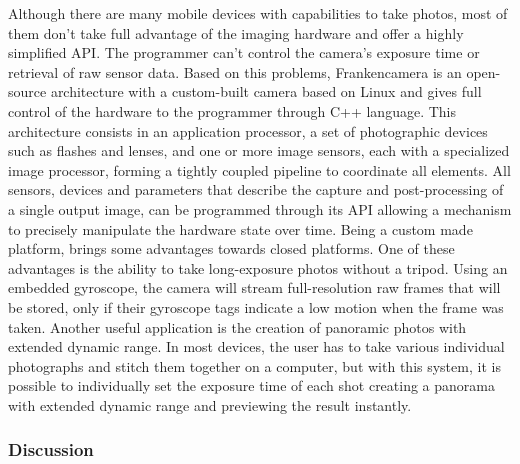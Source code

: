 Although there are many mobile devices with capabilities to take photos, most of them don’t take full advantage of the imaging hardware and offer a highly simplified API. The programmer can’t control the camera’s exposure time or retrieval of raw sensor data. Based on this problems, Frankencamera is an open-source architecture with a custom-built camera based on Linux and gives full control of the hardware to the programmer through C++ language. This architecture consists in an application processor, a set of photographic devices such as flashes and lenses, and one or more image sensors, each with a specialized image processor, forming a tightly coupled pipeline to coordinate all elements. All sensors, devices and parameters that describe the capture and post-processing of a single output image, can be programmed through its API allowing a mechanism to precisely manipulate the hardware state over time.
Being a custom made platform, brings some advantages towards closed platforms. One of these advantages is the ability to take long-exposure photos without a tripod. Using an embedded gyroscope, the camera will stream full-resolution raw frames that will be stored, only if their gyroscope tags indicate a low motion when the frame was taken. 
Another useful application is the creation of panoramic photos with extended dynamic range. In most devices, the user has to take various individual photographs and stitch them together on a computer, but with this system, it is possible to individually set the exposure time of each shot creating a panorama with extended dynamic range and previewing the result instantly.

\subsubsection{Discussion}

